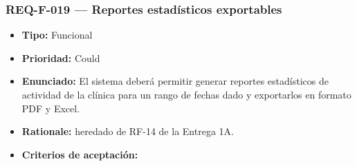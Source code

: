 \documentclass[
  spanish,
]{article}
\providecommand{\tightlist}{%
  \setlength{\itemsep}{0pt}\setlength{\parskip}{0pt}}
\begin{document}
\subsubsection{REQ-F-019 --- Reportes estadísticos
exportables}\label{req-f-019-reportes-estaduxedsticos-exportables}

\begin{itemize}
\tightlist
\item
  \textbf{Tipo:} Funcional
\item
  \textbf{Prioridad:} Could
\item
  \textbf{Enunciado:} El sistema deberá permitir generar reportes
  estadísticos de actividad de la clínica para un rango de fechas dado y
  exportarlos en formato PDF y Excel.
\item
  \textbf{Rationale:} heredado de RF-14 de la Entrega 1A.
\item
  \textbf{Criterios de aceptación:}


\end{itemize}
\end{document}
